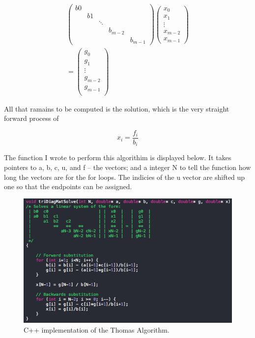 \documentclass[twocolumn, groupedaddress]{revtex4-1}
\begin{document}
\begin{align}
\label{eqn: mat system}
\left( \begin{array}{ccccc}
    b0 &    &        &         &         \\
	   & b1 &        &         &         \\
	   &    & \ddots &         &         \\
	   &	    &        & b_{m-2} &         \\
	   &    &        &         & b_{m-1}
   \end{array} \right)
\left( \begin{array}{c}
	x_0     \\
	x_1     \\
	\vdots  \\
	x_{m-2} \\
	x_{m-1}
   \end{array} \right) \nonumber
 \\ =
\left( \begin{array}{c}
	g_0     \\
	g_1     \\
	\vdots  \\
	g_{m-2} \\
	g_{m-1} \\
   \end{array} \right)
\end{align}

All that ramains to be computed is the solution, which is the very straight forward process of

\begin{equation}
x_i = \frac{f_i}{b_i}
\end{equation}

The function I wrote to perform this algorithim is displayed below.  It takes pointers to a, b, c, u, and f -- the vectors; and a integer N to tell the function how long the vectors are for the for loops.  The indicies of the u vector are shifted up one so that the endpoints can be assigned.

\begin{figure}[t]
	\centering
	\includegraphics[width = 0.8\linewidth]{cppThomasAlgorithm.png}
	\caption{C++ implementation of the Thomas Algorithm.}
\end{figure}
\end{document}
